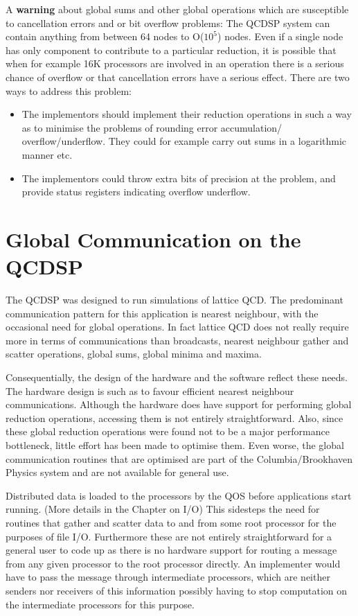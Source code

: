 A {\bf warning} about global sums and other global operations which
are susceptible to cancellation errors and or bit overflow problems:
The QCDSP system can contain anything from between 64 nodes to
O($10^5$) nodes. Even if a single node has only component to contribute
to a particular reduction, it is possible that when for example 16K 
processors are involved in an operation there is a serious chance
of overflow or that cancellation errors have a serious effect.
There are two ways to address this problem:
\begin{itemize}
\item
The implementors should implement their reduction operations in 
such a way as to minimise the problems of rounding error accumulation/
overflow/underflow. They could for example carry out sums in a logarithmic
manner etc.
\item
The implementors could throw extra bits of precision at the problem,
and provide status registers indicating overflow underflow. 
\end{itemize}

\section{Global Communication on the QCDSP}
The QCDSP was designed to run simulations of lattice QCD. The predominant
communication pattern for this application is nearest neighbour, with
the occasional need for global operations. In fact lattice QCD does
not really require more in terms of communications than
broadcasts, nearest neighbour gather and scatter operations, global
sums, global minima and maxima. 

Consequentially, the design of the hardware and the software reflect
these needs. The hardware design is such as to favour efficient
nearest neighbour communications. Although the hardware does have
support for performing global reduction operations, accessing them is
not entirely straightforward. Also, since these global reduction
operations were found not to be a major performance bottleneck, little
effort has been made to optimise them. Even worse, the global
communication routines that are optimised are part of the
Columbia/Brookhaven Physics system and are not available for general
use.

Distributed data is loaded to the processors by the QOS before applications
start running. (More details in the Chapter on I/O) This sidesteps the
need for routines that gather and scatter data to and from some
root processor for the purposes of file I/O. Furthermore these are not
entirely straightforward for a general user to code up as there is no
hardware support for routing a message from any given processor to the
root processor directly. An implementer would have to pass the message 
through intermediate processors, which are neither senders nor receivers
of this information possibly having to stop computation on the intermediate
processors for this purpose.


